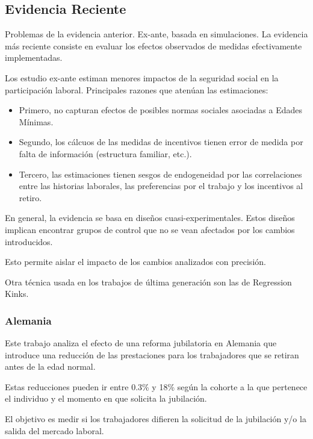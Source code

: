 \documentclass[]{article}
\providecommand{\tightlist}{%
  \setlength{\itemsep}{0pt}\setlength{\parskip}{0pt}}
\begin{document}
\hypertarget{evidencia-reciente}{%
\subsection{Evidencia Reciente}\label{evidencia-reciente}}

Problemas de la evidencia anterior. Ex-ante, basada en simulaciones. La
evidencia más reciente consiste en evaluar los efectos observados de
medidas efectivamente implementadas.

Los estudio ex-ante estiman menores impactos de la seguridad social en
la participación laboral. Principales razones que atenúan las
estimaciones:

\begin{itemize}
\tightlist
\item
  Primero, no capturan efectos de posibles normas sociales asociadas a
  Edades Mínimas.
\item
  Segundo, los cálcuos de las medidas de incentivos tienen error de
  medida por falta de información (estructura familiar, etc.).
\item
  Tercero, las estimaciones tienen sesgos de endogeneidad por las
  correlaciones entre las historias laborales, las preferencias por el
  trabajo y los incentivos al retiro.
\end{itemize}

En general, la evidencia se basa en diseños cuasi-experimentales. Estos
diseños implican encontrar grupos de control que no se vean afectados
por los cambios introducidos.

Esto permite aislar el impacto de los cambios analizados con precisión.

Otra técnica usada en los trabajos de última generación son las de
Regression Kinks.

\hypertarget{alemania}{%
\subsubsection{Alemania}\label{alemania}}

Este trabajo analiza el efecto de una reforma jubilatoria en Alemania
que introduce una reducción de las prestaciones para los trabajadores
que se retiran antes de la edad normal.

Estas reducciones pueden ir entre 0.3\% y 18\% según la cohorte a la que
pertenece el individuo y el momento en que solicita la jubilación.

El objetivo es medir si los trabajadores difieren la solicitud de la
jubilación y/o la salida del mercado laboral.
\end{document}
